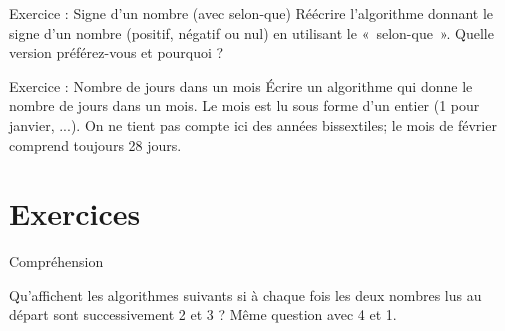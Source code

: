 \begin{Emphase}{Exercice : Signe d'un nombre (avec selon-que)}
Réécrire l'algorithme donnant le signe
d'un nombre (positif, négatif ou nul) en utilisant le
«~selon-que~». Quelle version préférez-vous et pourquoi ?
\end{Emphase}

\begin{Emphase}{Exercice : Nombre de jours dans un mois}
Écrire un algorithme qui donne le nombre de jours dans un mois. Le mois
est lu sous forme d'un entier (1 pour janvier, ...).
On ne tient pas compte ici des années bissextiles; le mois de février
comprend toujours 28 jours.
\end{Emphase}

\section{Exercices}

\begin{Exercice}{Compréhension}

Qu’affichent les algorithmes suivants si à chaque fois les deux nombres
lus au départ sont successivement 2 et 3 ? Même question avec 4 et 1.



\end{Exercice}

